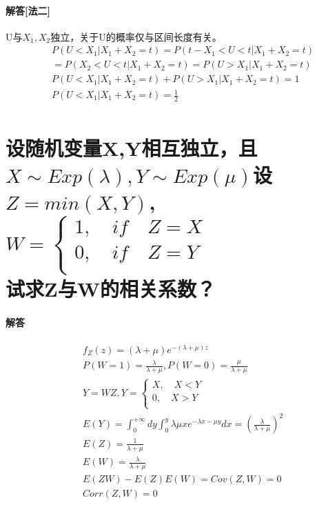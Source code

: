 \documentclass[UTF8]{ctexart}
\begin{document}
\paragraph{解答[法二]}
U与$X_1,X_2$独立，关于U的概率仅与区间长度有关。
\begin{equation*}
\begin{aligned}
&P(U<X_1\lvert X_1+X_2=t)=P(t-X_1<U<t\lvert X_1+X_2=t)\\
&=P(X_2<U<t\lvert X_1+X_2=t)=P(U>X_1\lvert X_1+X_2=t)\\
&P(U<X_1\lvert X_1+X_2=t)+P(U>X_1\lvert X_1+X_2=t)=1\\
&P(U<X_1\lvert X_1+X_2=t)=\frac{1}{2}\\
\end{aligned}
\end{equation*}
\section{设随机变量X,Y相互独立，且$X\sim Exp(\lambda),Y\sim Exp(\mu)$设$Z=min(X,Y)$,$W=\begin{cases}
1,\quad if\quad Z=X\\
0,\quad if\quad Z=Y\\
\end{cases}$\\
试求Z与W的相关系数？}
\paragraph{解答}
\begin{equation*}
\begin{aligned}
&f_Z(z)=(\lambda+\mu)e^{-(\lambda+\mu)z}\\
&P(W=1)=\frac{\lambda}{\lambda+\mu},P(W=0)=\frac{\mu}{\lambda+\mu}\\
&Y=WZ,Y=\begin{cases}
X,\quad X<Y\\
0,\quad X>Y\\
\end{cases}
\\
&E(Y)=\int_0^{+\infty}dy\int_0^y\lambda\mu xe^{-\lambda x-\mu y}dx=(\frac{\lambda}{\lambda+\mu})^2\\
&E(Z)=\frac{1}{\lambda+\mu}\\
&E(W)=\frac{\lambda}{\lambda+\mu}\\
&E(ZW)-E(Z)E(W)=Cov(Z,W)=0\\
&Corr(Z,W)=0\\
\end{aligned}
\end{equation*}
\end{document}
